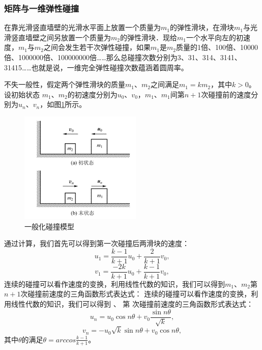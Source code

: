 \documentclass[12pt,a4paper]{ctexart}
\begin{document}
	\subsubsection{矩阵与一维弹性碰撞}
	在靠光滑竖直墙壁的光滑水平面上放置一个质量为$m_1$的弹性滑块，在滑块$m_1$与光滑竖直墙壁之间另放置一个质量为$m_2$的弹性滑块．现给$m_1$一个水平向左的初速度，$m_1$与$m_2$之间会发生若干次弹性碰撞，如果$m_1$是$m_2$质量的1倍、100倍、10000倍、1000000倍、100000000倍……那么总碰撞次数分别为3、31、314、3141、31415……也就是说，一维完全弹性碰撞次数蕴涵着圆周率\cite{RN23}。
	
	不失一般性，假定两个弹性滑块的质量$m_1$、$m_2$之间满足$m_1=km_2$，其中$k>0$。设初始状态 $m_1$、$m_2$的初速度分别为$u_0$、$v_0$，$m_1$、$m_1$间第$n+1$次碰撞前的速度分别为$u_n$、$v_n$，如图\ref{fig:一般化碰撞模型}所示。
	\begin{figure}[htbp]
		\centering
		\includegraphics{一般化碰撞模型.png}
		\caption{一般化碰撞模型}
		\label{fig:一般化碰撞模型}
	\end{figure}
	
	通过计算，我们首先可以得到第一次碰撞后两滑块的速度：
	\begin{equation}{{u}_{1}}=\frac{k-1}{k+1}{{u}_{0}}+\frac{2}{k+1}{{v}_{0}},\end{equation}
	\begin{equation}{{v}_{1}}=\frac{-2k}{k+1}{{u}_{0}}+\frac{k-1}{k+1}{{v}_{0}},\end{equation}
	连续的碰撞可以看作速度的变换，利用线性代数的知识，我们可以得到$m_1$、$m_2$第$n+1$次碰撞前速度的三角函数形式表达式：
	连续的碰撞可以看作速度的变换，利用线性代数的知识，我们可以得到 、 第 次碰撞前速度的三角函数形式表达式：
	\begin{equation}{{u}_{n}}={{u}_{0}}\cos n\theta +{{v}_{0}}\frac{\sin n\theta }{\sqrt{k}},\end{equation}
	\begin{equation}{{v}_{n}}=-{{u}_{0}}\sqrt{k}\sin n\theta +{{v}_{0}}\cos n\theta ,\end{equation}
	其中$\theta$的满足$\theta =arccos\frac{k-1}{k+1}$。
	
\end{document}
